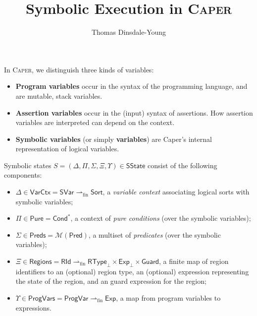 \documentclass[a4paper]{article}
\newcommand{\fpfun}{\rightharpoonup_{\mathrm{fin}}}
\newcommand{\mktype}[1]{\mathsf{#1}}
\newcommand{\tsvars}{\mktype{SVar}}
\newcommand{\tsort}{\mktype{Sort}}
\newcommand{\tcond}{\mktype{Cond}}
\newcommand{\tpred}{\mktype{Pred}}
\newcommand{\trid}{\mktype{RId}}
\newcommand{\trty}{\mktype{RType}}
\newcommand{\texp}{\mktype{Exp}}
\newcommand{\tguard}{\mktype{Guard}}
\newcommand{\tpvar}{\mktype{ProgVar}}
\newcommand{\tsstate}{\mktype{SState}}
\newcommand{\tvctx}{\mktype{VarCtx}}
\newcommand{\tpcnds}{\mktype{Pure}}
\newcommand{\tpreds}{\mktype{Preds}}
\newcommand{\tregs}{\mktype{Regions}}
\newcommand{\tpvars}{\mktype{ProgVars}}
\newcommand{\sstate}{S}
\newcommand{\vctx}{\Delta}
\newcommand{\pcnds}{\Pi}
\newcommand{\preds}{\Sigma}
\newcommand{\regs}{\Xi}
\newcommand{\pvars}{\Upsilon}
\begin{document}
\title{Symbolic Execution in \textsc{Caper}}
\author{Thomas Dinsdale-Young}
\maketitle

In \textsc{Caper}, we distinguish three kinds of variables:
\begin{itemize}
  \item \textbf{Program variables} occur in the syntax of the programming language, and are mutable, stack variables.
  \item \textbf{Assertion variables} occur in the (input) syntax of assertions.
    How assertion variables are interpreted can depend on the context.
  \item \textbf{Symbolic variables} (or simply \textbf{variables}) are Caper's internal representation of logical variables.
\end{itemize}

Symbolic states $\sstate = (\vctx,\pcnds,\preds,\regs,\pvars) \in \tsstate$ consist of the following components:
\begin{itemize}
  \item $\vctx \in \tvctx = \tsvars \fpfun \tsort$, a \emph{variable context} associating logical sorts with symbolic variables;
  \item $\pcnds \in \tpcnds = \tcond^*$, a context of \emph{pure conditions} (over the symbolic variables);
  \item $\preds \in \tpreds = \mathcal{M}(\tpred)$, a multiset of \emph{predicates} (over the symbolic variables);
  \item $\regs \in \tregs = \trid \fpfun \trty_\bot \times \texp_\bot \times \tguard$, a finite map of region identifiers to an (optional) region type, an (optional) expression representing the state of the region, and an guard expression for the region;
  \item $\pvars \in \tpvars = \tpvar \fpfun \texp$, a map from program variables to expressions.
\end{itemize}
\end{document}

